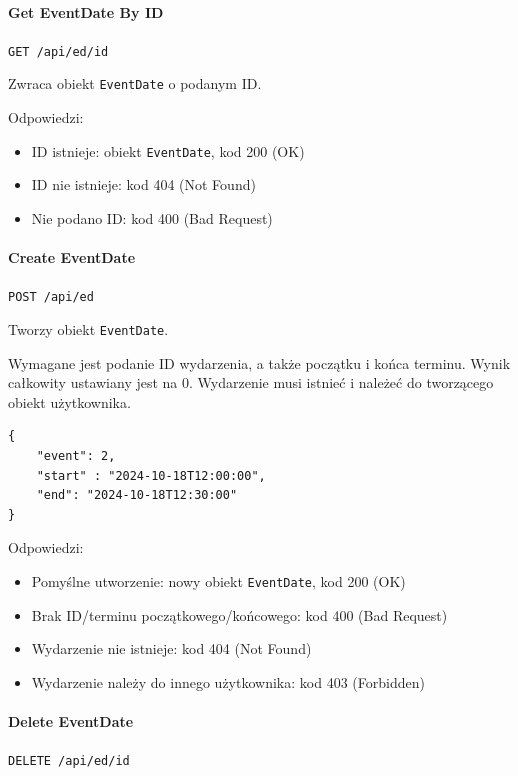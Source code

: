 \documentclass[a4paper,twoside,12pt]{book}
\begin{document}
\paragraph{Get EventDate By ID}

\texttt{GET /api/ed/{id}}

Zwraca obiekt \texttt{EventDate} o podanym ID.

Odpowiedzi: 
\begin{itemize}
	\item ID istnieje: obiekt \texttt{EventDate}, kod 200 (OK) 
	\item ID nie istnieje: kod 404 (Not Found) 
	\item Nie podano ID: kod 400 (Bad Request)
\end{itemize}

\paragraph{Create EventDate}

\texttt{POST /api/ed}

Tworzy obiekt \texttt{EventDate}.

Wymagane jest podanie ID wydarzenia, a także początku i końca terminu. Wynik całkowity ustawiany jest na 0. Wydarzenie musi istnieć i należeć do tworzącego obiekt użytkownika.

\begin{verbatim}
{
    "event": 2,
    "start" : "2024-10-18T12:00:00",
    "end": "2024-10-18T12:30:00"
}
\end{verbatim}

Odpowiedzi: 
\begin{itemize}
	\item Pomyślne utworzenie: nowy obiekt \texttt{EventDate}, kod 200 (OK) 
	\item Brak ID/terminu początkowego/końcowego: kod 400 (Bad Request)
	\item Wydarzenie nie istnieje: kod 404 (Not Found) 
	\item Wydarzenie należy do innego użytkownika: kod 403 (Forbidden) 
\end{itemize}

\paragraph{Delete EventDate}

\texttt{DELETE /api/ed/{id}}
\end{document}
